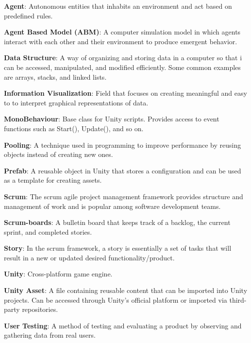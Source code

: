 
\noindent
\label{itm:agent}\textbf{Agent}: Autonomous entities that inhabits an environment and act based on predefined rules.

\noindent
\label{itm:abm}\textbf{Agent Based Model (ABM)}: A computer simulation model in which agents interact with each other and their environment to produce emergent behavior. 

\noindent
\label{itm:data-structure}\textbf{Data Structure}: A way of organizing and storing data in a computer so that i can be accessed, manipulated, and modified efficiently. Some common examples are arrays, stacks, and linked lists. 

\noindent
\label{itm:information-visualization}\textbf{Information Visualization}: Field that focuses on creating meaningful and easy to to interpret graphical representations of data.

\noindent
\label{itm:monobehaviour}\textbf{MonoBehaviour}: Base class for Unity scripts. Provides access to event functions such as Start(), Update(), and so on.

\noindent
\label{itm:pooling}\textbf{Pooling}: A technique used in programming to improve performance by reusing objects instead of creating new ones. 

\noindent
\label{itm:prefab}\textbf{Prefab}: A reusable object in Unity that stores a configuration and can be used as a template for creating assets.

\noindent
\label{itm:scrum}\textbf{Scrum}: The scrum agile project management framework provides structure and management of work and is popular among software development teams.

\noindent 
\label{itm:scrum-boards}\textbf{Scrum-boards}: A bulletin board that keeps track of a backlog, the current sprint, and completed stories.

\noindent
\label{itm:story}\textbf{Story}: In the scrum framework, a story is essentially a set of tasks that will result in a new or updated desired functionality/product.  

\noindent
\label{itm:unity}\textbf{Unity}: Cross-platform game engine.

\noindent
\label{itm:unity-asset}\textbf{Unity Asset}: A file  containing reusable content that can be imported into Unity projects. Can be accessed through Unity's official platform or imported via third-party repositories. 

\noindent
\label{itm:user-testing}\textbf{User Testing}: A method of testing and evaluating a product by observing and gathering data from real users. 

